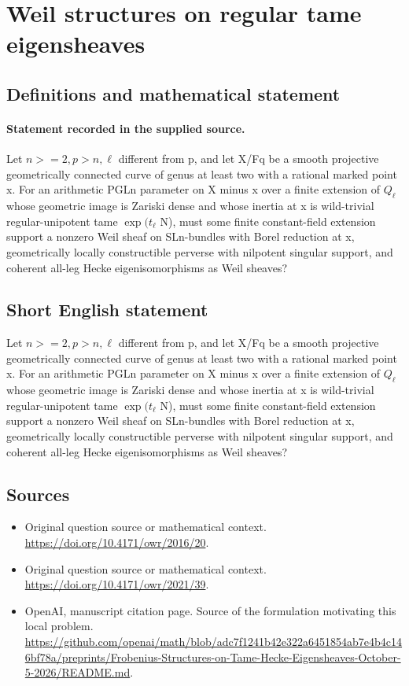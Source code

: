\documentclass[11pt]{article}
\begin{document}
\section*{Weil structures on regular tame eigensheaves}\label{statement}
\subsection{Definitions and mathematical statement}
\paragraph{Statement recorded in the supplied source.}
Let $n>=2,p>n,\ell $ different from p, and let X/Fq be a smooth projective geometrically connected curve of genus at least two with a rational marked point x. For an arithmetic PGLn parameter on X minus x over a finite extension of $Q_\ell $ whose geometric image is Zariski dense and whose inertia at x is wild-trivial regular-unipotent tame $\exp (t_\ell $ N), must some finite constant-field extension support a nonzero Weil sheaf on SLn-bundles with Borel reduction at x, geometrically locally constructible perverse with nilpotent singular support, and coherent all-leg Hecke eigenisomorphisms as Weil sheaves?
\subsection{Short English statement}
Let $n>=2,p>n,\ell $ different from p, and let X/Fq be a smooth projective geometrically connected curve of genus at least two with a rational marked point x. For an arithmetic PGLn parameter on X minus x over a finite extension of $Q_\ell $ whose geometric image is Zariski dense and whose inertia at x is wild-trivial regular-unipotent tame $\exp (t_\ell $ N), must some finite constant-field extension support a nonzero Weil sheaf on SLn-bundles with Borel reduction at x, geometrically locally constructible perverse with nilpotent singular support, and coherent all-leg Hecke eigenisomorphisms as Weil sheaves?
\subsection{Sources}
\begin{itemize}
\item[S1] Original question source or mathematical context.
\url{https://doi.org/10.4171/owr/2016/20}.
\item[S2] Original question source or mathematical context.
\url{https://doi.org/10.4171/owr/2021/39}.
\item[S3] OpenAI, manuscript citation page. Source of the formulation motivating this local problem.
\url{https://github.com/openai/math/blob/adc7f1241b42e322a6451854ab7e4b4c146bf78a/preprints/Frobenius-Structures-on-Tame-Hecke-Eigensheaves-October-5-2026/README.md}.
\end{itemize}
\end{document}
